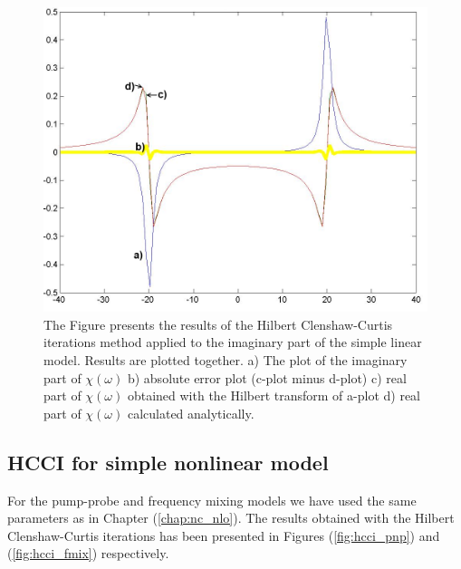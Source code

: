 \documentclass[12pt,twoside,a4paper]{article}
\numberwithin{equation}{subsection}
\numberwithin{figure}{subsection}
\begin{document}
\begin{figure} 
  \includegraphics[width=150mm]{img/hcc_lin2.png}
  \caption{The Figure presents the results of the Hilbert Clenshaw-Curtis iterations method applied to the imaginary part of the simple
  linear model. Results are plotted together.
   a) The plot of the imaginary part of $\chi (\omega )$ 
   b) absolute error plot (c-plot minus d-plot) 
   c) real part of $\chi (\omega )$ obtained with the Hilbert transform of a-plot 
   d) real part of $\chi (\omega )$ calculated analytically. \label{fig:cci_lin2}
  }
\end{figure}

\subsection{HCCI for simple nonlinear model} \label{chap:hcc_nlo}

For the pump-probe and frequency mixing models we have used the same parameters as in Chapter (\ref{chap:nc_nlo}). The results
obtained with the Hilbert Clenshaw-Curtis iterations has been presented in Figures (\ref{fig:hcci_pnp}) and (\ref{fig:hcci_fmix})
respectively.
\end{document}
